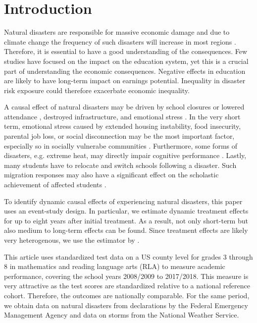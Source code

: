 
\section{Introduction}

Natural disasters are responsible for massive economic damage and due to climate change the frequency of such disasters will increase in most regions \citep{IPCC_2021}. Therefore, it is essential to have a good understanding of the consequences. Few studies have focused on the impact on the education system, yet this is a crucial part of understanding the economic consequences. Negative effects in education are likely to have long-term impact on earnings potential. Inequality in disaster risk exposure could therefore exacerbate economic inequality.

A causal effect of natural disasters may be driven by school closures \citep{Grewening_2020} or lowered attendance \citep{Spencer_2016}, destroyed infrastructure, and emotional stress \citep{Vogel_2016}. In the very short term, emotional stress caused by extended housing instability, food insecurity, parental job loss, or social disconnection may be the most important factor, especially so in socially vulnerabe communities \citep{Gao_2022}. Furthermore, some forms of disasters, e.g. extreme heat, may directly impair cognitive performance \citep{Ramsey_1995}. Lastly, many students have to relocate and switch schools following a disaster. Such migration responses may also have a significant effect on the scholastic achievement of affected students \citep{Pane_2008, Sacerdote_2012}.

To identify dynamic causal effects of experiencing natural disasters, this paper uses an event-study design. In particular, we estimate dynamic treatment effects for up to eight years after initial treatment. As a result, not only short-term but also medium to long-term effects can be found. Since treatment effects are likely very heterogenous, we use the estimator by \cite{Sun_2021}.

This article uses standardized test data on a US county level for grades 3 through 8 in mathematics and reading language arts (RLA) to measure academic performance, covering the school years 2008/2009 to 2017/2018. This measure is very attractive as the test scores are standardized relative to a national reference cohort. Therefore, the outcomes are nationally comparable. For the same period, we obtain data on natural disasters from declarations by the Federal Emergency Management Agency and data on storms from the National Weather Service.

